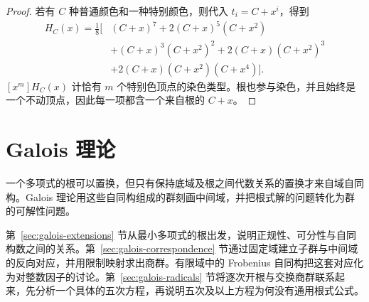 \documentclass[lang=cn,a4paper,fontset=none,zihao=false,10pt,openany,twoside]{beautybook}
\numberwithin{algorithm}{chapter}
\begin{document}
\begin{proof}
若有 $C$ 种普通颜色和一种特别颜色，则代入 $t_i=C+x^i$，得到
\[
 \begin{aligned}
 H_C(x)=\frac18\bigl[&(C+x)^7+2(C+x)^5(C+x^2)\\
 &+(C+x)^3(C+x^2)^2+2(C+x)(C+x^2)^3\\
 &+2(C+x)(C+x^2)(C+x^4)\bigr].
 \end{aligned}
\]
$[x^m]H_C(x)$ 计恰有 $m$ 个特别色顶点的染色类型。根也参与染色，并且始终是一个不动顶点，因此每一项都含一个来自根的 $C+x$。
\end{proof}


\FloatBarrier

\chapter{Galois 理论}\label{chap:galois}
\begin{wenxintishi}
一个多项式的根可以置换，但只有保持底域及根之间代数关系的置换才来自域自同构。Galois 理论用这些自同构组成的群刻画中间域，并把根式解的问题转化为群的可解性问题。
\end{wenxintishi}

第~\ref{sec:galois-extensions} 节从最小多项式的根出发，说明正规性、可分性与自同构数之间的关系。第~\ref{sec:galois-correspondence} 节通过固定域建立子群与中间域的反向对应，并用限制映射求出商群。有限域中的 Frobenius 自同构把这套对应化为对整数因子的讨论。第~\ref{sec:galois-radicals} 节将逐次开根与交换商群联系起来，先分析一个具体的五次方程，再说明五次及以上方程为何没有通用根式公式。

\begin{center}
\end{center}
\end{document}
